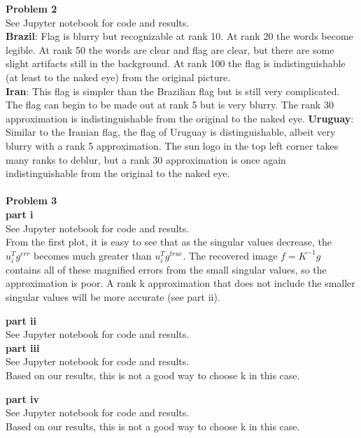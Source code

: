 \documentclass{article} %
\begin{document}
\textbf{Problem 2} \\
See Jupyter notebook for code and results. \\
\textbf{Brazil}: Flag is blurry but recognizable at rank 10.  At rank 20 the words become legible.  At rank 50 the words are clear and flag are clear, but there are some slight artifacts still in the background.  At rank 100 the flag is indistinguishable (at least to the naked eye) from the original picture. \\
\textbf{Iran}: This flag is simpler than the Brazilian flag but is still very complicated.  The flag can begin to be made out at rank 5 but is very blurry.  The rank 30 approximation is indistinguishable from the original to the naked eye.
\textbf{Uruguay}:  Similar to the Iranian flag, the flag of Uruguay is distinguishable, albeit very blurry with a rank 5 approximation.  The sun logo in the top left corner takes many ranks to deblur, but a rank 30 approximation is once again indistinguishable from the original to the naked eye. \\
\\


\textbf{Problem 3} \\
\textbf{part i} \\
See Jupyter notebook for code and results. \\
From the first plot, it is easy to see that as the singular values decrease, the $u_i^T g^{err}$ becomes much greater than $u_i^T g^{true}$.  The recovered image $f=K^{-1}g$ contains all of these magnified errors from the small singular values, so the approximation is poor.  A rank k approximation that does not include the smaller singular values will be more accurate (see part ii).

\textbf{part ii} \\
See Jupyter notebook for code and results. \\

\textbf{part iii} \\
See Jupyter notebook for code and results. \\
Based on our results, this is not a good way to choose k in this case.

\textbf{part iv} \\
See Jupyter notebook for code and results. \\
Based on our results, this is not a good way to choose k in this case.
\\
\end{document}
